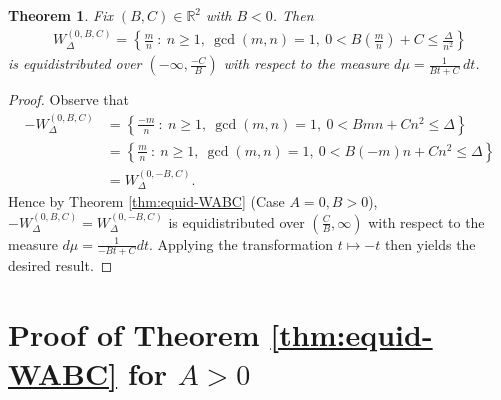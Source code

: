 \documentclass[11pt,letterpaper,reqno]{amsart}
\newtheorem{theorem}{Theorem}[section]
\numberwithin{equation}{section}
\numberwithin{figure}{section}
\numberwithin{table}{section}
\newcommand{\lrp}[1]{\left(#1\right)}
\newcommand{\lrcb}[1]{\left\{#1\right\}}
\newcommand{\RR}{\mathbb{R}}
\begin{document}
{
\renewcommand{\thetheorem}{\ref{thm:equid-WABC} (\(A=0,B<0\))}
\begin{theorem} \label{thm:equid-W--A=0,B<0}
    Fix $(B,C) \in \RR^2$ with $B < 0$. Then
    \begin{align}
        W_{\Delta}^{(0,B,C)} = \lrcb{\frac{m}{n}  ~:~ n\ge1,~ \gcd(m,n)=1,~ 0 < B \lrp{\frac mn} + C \le \frac{\Delta}{n^2}} 
    \end{align} 
    is equidistributed over $(-\infty,\frac{-C}{B})$ with respect to the measure $d\mu = \frac{1}{Bt+C} \,dt$.
\end{theorem}
}
\begin{proof}
    Observe that 
    \begin{align}
        -W_{\Delta}^{(0,B,C)} 
        &= \lrcb{\frac{-m}{n}  ~:~ n\ge1,~ \gcd(m,n)=1,~ 0 < B mn + C n^2 \le \Delta} \\
        &= \lrcb{\frac{m}{n}  ~:~ n\ge1,~ \gcd(m,n)=1,~ 0 < B (-m)n + C n^2 \le \Delta} \\
        &= W_{\Delta}^{(0,-B,C)}.
    \end{align} 
    Hence by Theorem \ref{thm:equid-WABC} (Case $A = 0, B > 0$), $-W_{\Delta}^{(0,B,C)} = W_{\Delta}^{(0,-B,C)}$ is equidistributed over $(\frac CB, \infty)$ with respect to the measure $d\mu = \frac{1}{-Bt+C}dt$. Applying the transformation $t \mapsto -t$ then yields the desired result.
\end{proof}









\section{Proof of Theorem \ref{thm:equid-WABC} for \texorpdfstring{$A > 0$}{A>0}}
\label{sec:equid-WABC--A>0}

\end{document}
